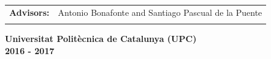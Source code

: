 \documentclass[11pt,a4paper]{report}
\begin{document}
\begin{titlepage}
\begin{center}
\begin{tabular}{ll}

			\large{\textbf{Advisors:}}	&
			\large{Antonio Bonafonte and Santiago Pascual de la Puente} \\	
			\vspace{1cm}
		\end{tabular}

		\large{\textbf{Universitat Politècnica de Catalunya (UPC)}}\\
		\large{\textbf{2016 - 2017}}\\
	\end{center}
\end{titlepage}

\clearpage

\doublespacing




\doublespacing
\tableofcontents
\listoffigures
\listoftables

%








\begin{appendix}

\end{appendix}
\end{document}
